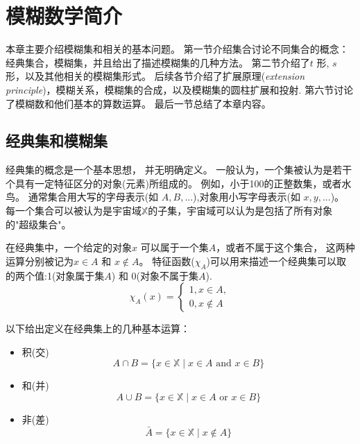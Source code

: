 \chapter{模糊数学简介}
    本章主要介绍模糊集和相关的基本问题。
    第一节介绍集合讨论不同集合的概念：经典集合，模糊集，并且给出了描述模糊集的几种方法。
    第二节介绍了$t$ 形, $s$ 形，以及其他相关的模糊集形式。
    后续各节介绍了扩展原理({\it{extension principle}})，模糊关系，模糊集的合成，以及模糊集的圆柱扩展和投射. 
    第六节讨论了模糊数和他们基本的算数运算。
    最后一节总结了本章内容。
\maketitle

\section{经典集和模糊集}
经典集的概念是一个基本思想， 并无明确定义。
一般认为，一个集被认为是若干个具有一定特征区分的对象(元素)所组成的。
例如，小于100的正整数集，或者水鸟。
通常集合用大写的字母表示(如 $A, B, ...$),对象用小写字母表示(如 $x, y,...$)。
每一个集合可以被认为是宇宙域$\mathbb{X}$的子集，宇宙域可以认为是包括了所有对象的"超级集合"。

在经典集中，一个给定的对象$x$ 可以属于一个集$A$，或者不属于这个集合， 这两种运算分别被记为$x \in A$ 和 $x \notin A$。
特征函数($\chi_{A}$)可以用来描述一个经典集可以取的两个值:1(对象属于集$A$) 和 0(对象不属于集$A$).
\begin{equation}
    \chi_{A}(x)=\left\{\begin{array}{l}
    1, x \in A, \\
    0, x \notin A
    \end{array}\right.
    \end{equation}

以下给出定义在经典集上的几种基本运算：
\begin{itemize}
    \item 积(交) 
\begin{equation}
    A \cap B=\{x \in \mathbb{X} \mid x \in A \text { and } x \in B\}     
\end{equation}
    \item 和(并) 
\begin{equation}
    A \cup B=\{x \in \mathbb{X} \mid x \in A \text { or } x \in B\}
\end{equation}
    \item 非(差)
\begin{equation}
    \bar{A}=\{x \in \mathbb{X} \mid x \notin A\}
\end{equation}
\end{itemize}

